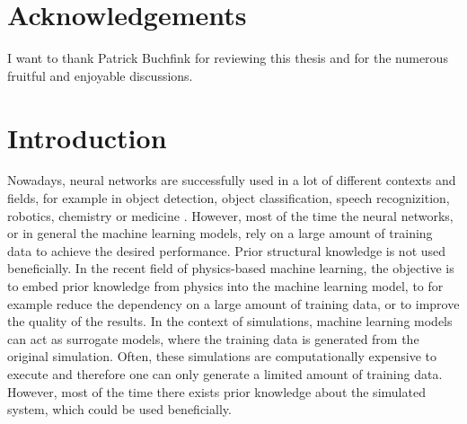 \documentclass[twoside,a4paper]{article}
\begin{document}
\section*{Acknowledgements}
I want to thank Patrick Buchfink for reviewing this thesis and for the numerous
fruitful and enjoyable discussions.
\clearpage
\newpage\thispagestyle{plain}\null
\newpage\thispagestyle{plain}

%
%
\setcounter{tocdepth}{2}
\tableofcontents
\clearpage
\newpage\thispagestyle{plain}\null
%
%
\newpage
{} 
%
%
\section{Introduction}

Nowadays, neural networks are successfully used in a lot of different contexts and fields, 
for example in object detection, object classification, speech recognizition, robotics,
chemistry or medicine \cite{Goodfellow2016}.
However, most of the time the neural networks, or in general the machine learning models, 
rely on a large amount of training data to achieve the desired performance. Prior structural
knowledge is not used beneficially. In the recent field of physics-based machine
learning, the objective is to embed prior knowledge from physics into the machine 
learning model, to for example reduce the dependency on a large amount of training data, 
or to improve the quality of the results.
In the context of simulations, machine learning models can act as surrogate models,
where the training data is generated from the original simulation. Often, these 
simulations are computationally expensive to execute and therefore one can only 
generate a limited amount of training data. However, most of the time there exists 
prior knowledge about the simulated system, which could be used beneficially.
\end{document}
